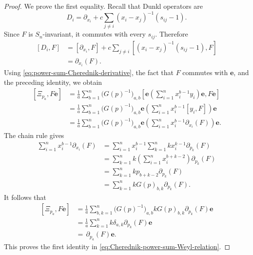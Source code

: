 \documentclass[11pt,reqno]{amsart}
\theoremstyle{definition}
\newcommand{\be}{\mathbf{e}}
\begin{document}
\begin{proof}
	We prove the first equality.
	Recall that  Dunkl operators are
	\[
	  D_i
	  =
	  \partial_{x_i}
	  +
	  c\sum_{j\neq i}(x_i-x_j)^{-1}(s_{ij}-1).
	\]
	Since \(F\) is \(S_n\)-invariant, it commutes with every \(s_{ij}\).
	Therefore
	\[
	\begin{aligned}
	  {}[D_i,F]
	  &=
	  [\partial_{x_i},F]
	  +
	  c\sum_{j\neq i}
	  \left[
	    (x_i-x_j)^{-1}(s_{ij}-1),
	    F
	  \right]                                                     \\
	  &=
	  \partial_{x_i}(F).
	\end{aligned}
	\]
	Using \eqref{eq:power-sum-Cherednik-derivative}, the fact that
	\(F\) commutes with \(\be\), and the preceding identity, we obtain
	\[
	\begin{aligned}
	  {}[ \Xi_{p_a} ,F\be]
	  &=
	  \frac{1}{a}\sum_{b=1}^n
	  \bigl(G(p)^{-1}\bigr)_{a, b}
	  \left[
	    \be\left(\sum_{i=1}^n x_i^{b-1}y_i\right)\be,
	    F\be
	  \right]                                                     \\
	  &=
	  \frac{1}{a}\sum_{b=1}^n
	  \bigl(G(p)^{-1}\bigr)_{a, b}
	  \be\left(
	    \sum_{i=1}^n x_i^{b-1}[y_i,F]
	  \right)\be                                                  \\
	  &=
	  \frac{1}{a}\sum_{b=1}^n
	  \bigl(G(p)^{-1}\bigr)_{a, b}
	  \be\left(
	    \sum_{i=1}^n x_i^{b-1}\partial_{x_i}(F)
	  \right)\be.
	\end{aligned}
	\]
	The chain rule gives
	\[
	\begin{aligned}
	  \sum_{i=1}^n x_i^{b-1}\partial_{x_i} (F)
	  &=
	  \sum_{i=1}^n x_i^{b-1}
	  \sum_{k=1}^n
	  kx_i^{k-1}\partial_{p_k}(F )                              \\
	  &=
	  \sum_{k=1}^n
	  k\left(\sum_{i=1}^n x_i^{b+k-2}\right)
	  \partial_{p_k}(F)                                          \\
	  &=
	  \sum_{k=1}^n
	  k p_{b+k-2}\partial_{p_k}(F)                               \\
	  &=
	  \sum_{k=1}^n
	  kG(p)_{b, k}\partial_{p_k}(F).
	\end{aligned}
	\]
	It follows that
	\[
	\begin{aligned}
	  {}[ \Xi_{p_a} ,F\be]
	  &=
	  \frac{1}{a}
	  \sum_{b,k=1}^n
	  \bigl(G(p)^{-1}\bigr)_{a, b}
	  kG(p)_{b, k}\partial_{p_k}(F)\be                             \\
	  &=
	  \frac{1}{a}
	  \sum_{k=1}^n
	  k\delta_{a, k}\partial_{p_k}(F)\be                           \\
	  &=
	  \,\partial_{p_a}(F)\be.
	\end{aligned}
	\]
	This proves the first identity in
	\eqref{eq:Cherednik-power-sum-Weyl-relation}. 
	

\end{proof}
\end{document}
